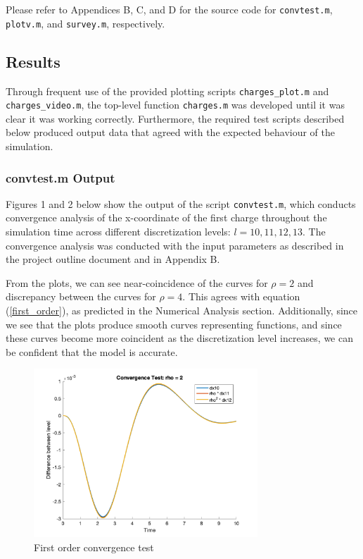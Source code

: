 \documentclass[10pt]{article}
\def\code#1{\texttt{#1}} %
\begin{document}
Please refer to Appendices B, C, and D for the source code for \code{convtest.m}, \code{plotv.m}, and
\code{survey.m}, respectively.

\subsection*{Results}

Through frequent use of the provided plotting scripts \code{charges\_plot.m} and \code{charges\_video.m}, 
the top-level function \code{charges.m} was developed until it was clear it was working correctly. 
Furthermore, the required test scripts described below produced output data that agreed with the expected
behaviour of the simulation. 

\subsubsection*{convtest.m Output}

Figures 1 and 2 below show the output of the script \code{convtest.m}, which conducts convergence analysis
of the x-coordinate of the first charge throughout the simulation time across different discretization 
levels: $l=10, 11, 12, 13$. The convergence analysis was conducted with the input parameters as described 
in the project outline document and in Appendix B. 

From the plots, we can see near-coincidence of the curves for $\rho=2$ and discrepancy between the curves 
for $\rho=4$. This agrees with equation (\ref{first_order}), as predicted in the Numerical Analysis section. 
Additionally, since we see that the plots produce smooth curves representing functions, and since these 
curves become more coincident as the discretization level increases, we can be confident that the model is 
accurate.

\begin{figure}[H]
\centering
\includegraphics[width=0.75\textwidth]{ConvTest_2.png}
\caption{First order convergence test}
\end{figure}
\end{document}
